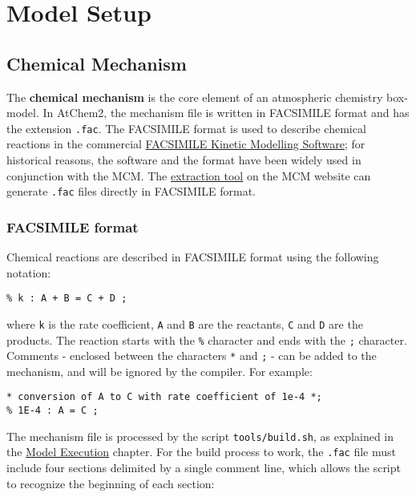\chapter{Model Setup} \label{ch:setup}

\section{Chemical Mechanism} \label{sec:mechanism}

The \textbf{chemical mechanism} is the core element of an atmospheric
chemistry box-model. In AtChem2, the mechanism file is written in
FACSIMILE format and has the extension \texttt{.fac}. The FACSIMILE
format is used to describe chemical reactions in the commercial
\href{http://www.mcpa-software.com/}{FACSIMILE Kinetic Modelling
  Software}; for historical reasons, the software and the format have
been widely used in conjunction with the MCM. The
\href{http://mcm.leeds.ac.uk/MCMv3.3.1/extract.htt}{extraction tool}
on the MCM website can generate \texttt{.fac} files directly in
FACSIMILE format.

\subsection{FACSIMILE format} \label{subsec:facsimile-format}

Chemical reactions are described in FACSIMILE format using the
following notation:

\begin{verbatim}
% k : A + B = C + D ;
\end{verbatim}

where \texttt{k} is the rate coefficient, \texttt{A} and \texttt{B}
are the reactants, \texttt{C} and \texttt{D} are the products. The
reaction starts with the \texttt{\%} character and ends with the
\texttt{;} character. Comments - enclosed between the characters
\texttt{*} and \texttt{;} - can be added to the mechanism, and will be
ignored by the compiler. For example:

\begin{verbatim}
* conversion of A to C with rate coefficient of 1e-4 *;
% 1E-4 : A = C ;
\end{verbatim}

The mechanism file is processed by the script \texttt{tools/build.sh},
as explained in the \hyperref[ch:execution]{Model Execution}
chapter. For the build process to work, the \texttt{.fac} file must
include four sections delimited by a single comment line, which allows
the script to recognize the beginning of each section:

